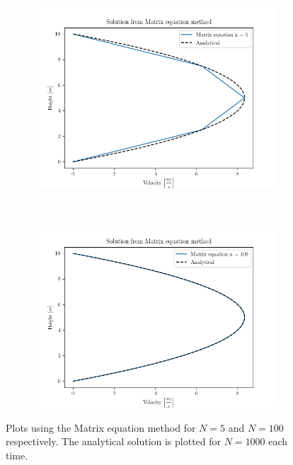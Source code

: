 \documentclass[10pt, a4paper]{amsart}
\begin{document}
\begin{figure}
	\centering
	\begin{subfigure}[b]{0.5\textwidth}
	\includegraphics[width=\textwidth]{./code/plot/plot_Matrix equation5.png}
	\end{subfigure}
	~
	\begin{subfigure}[b]{0.5\textwidth}
		\includegraphics[width=\textwidth]{./code/plot/plot_Matrix equation100.png}
	\end{subfigure}
	\caption{Plots using the Matrix equation method for $N 	= 5$ and $N = 100$ respectively. The analytical solution is plotted for $N = 1000$ each time.}
	\label{fig:matrix_eq}
\end{figure}
\end{document}
